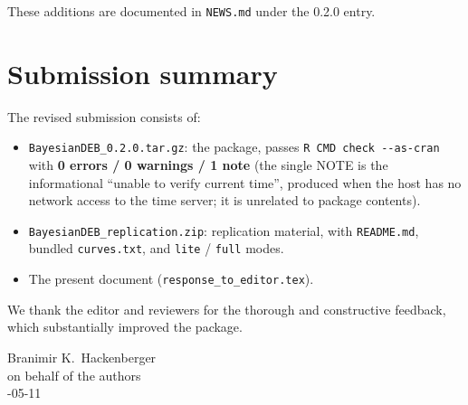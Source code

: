 \documentclass[11pt,a4paper]{article}
\newcommand{\code}[1]{\texttt{#1}}
\begin{document}
These additions are documented in \code{NEWS.md} under the 0.2.0
entry.

\section{Submission summary}

The revised submission consists of:

\begin{itemize}[nosep]
\item \code{BayesianDEB\_0.2.0.tar.gz}: the package, passes
  \verb|R CMD check --as-cran| with \textbf{0 errors / 0 warnings /
  1 note} (the single NOTE is the informational ``unable to verify
  current time'', produced when the host has no network access to
  the time server; it is unrelated to package contents).
\item \code{BayesianDEB\_replication.zip}: replication material,
  with \code{README.md}, bundled \code{curves.txt}, and \code{lite}
  / \code{full} modes.
\item The present document (\code{response\_to\_editor.tex}).
\end{itemize}

We thank the editor and reviewers for the thorough and constructive
feedback, which substantially improved the package.

\vspace{1em}
\noindent Branimir K.\ Hackenberger\\
\noindent on behalf of the authors\\
-05-11
\end{document}
